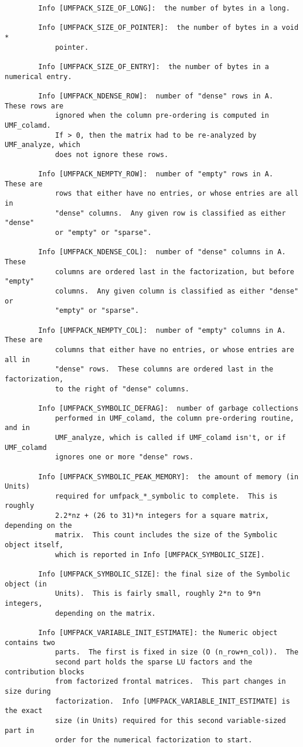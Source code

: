 {\begin{verbatim}
        Info [UMFPACK_SIZE_OF_LONG]:  the number of bytes in a long.

        Info [UMFPACK_SIZE_OF_POINTER]:  the number of bytes in a void *
            pointer.

        Info [UMFPACK_SIZE_OF_ENTRY]:  the number of bytes in a numerical entry.

        Info [UMFPACK_NDENSE_ROW]:  number of "dense" rows in A.  These rows are
            ignored when the column pre-ordering is computed in UMF_colamd.
            If > 0, then the matrix had to be re-analyzed by UMF_analyze, which
            does not ignore these rows.

        Info [UMFPACK_NEMPTY_ROW]:  number of "empty" rows in A.  These are
            rows that either have no entries, or whose entries are all in
            "dense" columns.  Any given row is classified as either "dense"
            or "empty" or "sparse".

        Info [UMFPACK_NDENSE_COL]:  number of "dense" columns in A.  These
            columns are ordered last in the factorization, but before "empty"
            columns.  Any given column is classified as either "dense" or
            "empty" or "sparse".

        Info [UMFPACK_NEMPTY_COL]:  number of "empty" columns in A.  These are
            columns that either have no entries, or whose entries are all in
            "dense" rows.  These columns are ordered last in the factorization,
            to the right of "dense" columns.

        Info [UMFPACK_SYMBOLIC_DEFRAG]:  number of garbage collections
            performed in UMF_colamd, the column pre-ordering routine, and in
            UMF_analyze, which is called if UMF_colamd isn't, or if UMF_colamd
            ignores one or more "dense" rows.

        Info [UMFPACK_SYMBOLIC_PEAK_MEMORY]:  the amount of memory (in Units)
            required for umfpack_*_symbolic to complete.  This is roughly
            2.2*nz + (26 to 31)*n integers for a square matrix, depending on the
            matrix.  This count includes the size of the Symbolic object itself,
            which is reported in Info [UMFPACK_SYMBOLIC_SIZE].

        Info [UMFPACK_SYMBOLIC_SIZE]: the final size of the Symbolic object (in
            Units).  This is fairly small, roughly 2*n to 9*n integers,
            depending on the matrix.

        Info [UMFPACK_VARIABLE_INIT_ESTIMATE]: the Numeric object contains two
            parts.  The first is fixed in size (O (n_row+n_col)).  The
            second part holds the sparse LU factors and the contribution blocks
            from factorized frontal matrices.  This part changes in size during
            factorization.  Info [UMFPACK_VARIABLE_INIT_ESTIMATE] is the exact
            size (in Units) required for this second variable-sized part in
            order for the numerical factorization to start.


\end{verbatim}}
